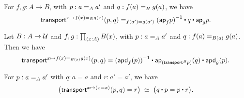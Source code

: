 \documentclass[hott-all.tex]{subfiles}
\begin{document}
\begin{thm}\label{thm:transport-path}
  For $f,g:A\to B$, with $p : \id[A]{a}{a'}$ and $q : \id[B]{f(a)}{g(a)}$, we have
  \begin{equation*}
    \id[f(a') = g(a')]{\transfib{x \mapsto \id[B]{f(x)}{g(x)}}{p}{q}}
    {\opp{(\apfunc{f}{p})} \ct q \ct \apfunc{g}{p}}.
  \end{equation*}
\end{thm}

%
\begin{thm}\label{thm:transport-path2}
  Let $B : A \to \type$ and $f,g : \prd{x:A} B(x)$, with $p : \id[A]{a}{a'}$ and $q : \id[B(a)]{f(a)}{g(a)}$.
  Then we have
  \begin{equation*}
    \transfib{x \mapsto \id[B(x)]{f(x)}{g(x)}}{p}{q} =
    \opp{(\apdfunc{f}(p))} \ct \apfunc{(\transfibf{B}{p})}(q) \ct \apdfunc{g}(p).
  \end{equation*}
\end{thm}

%
\begin{thm}\label{thm:dpath-path}
  For $p:\id[A]a{a'}$ with $q:a=a$ and $r:a'=a'$, we have
  \[ \eqvspaced{ \big(\transfib{x\mapsto (x=x)}{p}{q} = r \big) }{ \big( q \ct p = p \ct r \big). } \]
\end{thm}

%
%
\end{document}
